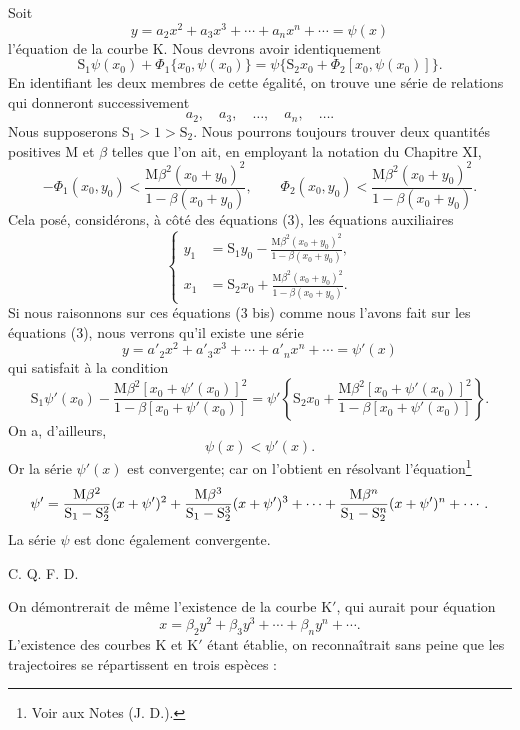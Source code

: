 \documentclass[11pt]{article}
\begin{document}
Soit
\[
y=a_2x^2+a_3x^3+\cdots+a_nx^n+\cdots=\psi(x)
\]
l’équation de la courbe K. Nous devrons avoir identiquement
\[
\mathrm{S}_1\psi(x_0)+\Phi_1\{x_0,\psi(x_0)\}
=\psi\{\mathrm{S}_2x_0+\Phi_2[x_0,\psi(x_0)]\}.
\]
En identifiant les deux membres de cette égalité, on trouve une série de relations qui donneront successivement
\[
a_2,
\quad a_3,
\quad \ldots,
\quad a_n,
\quad \ldots.
\]
Nous supposerons $\mathrm{S}_1>1>\mathrm{S}_2$. Nous pourrons toujours trouver deux quantités positives $\mathrm{M}$ et $\beta$ telles que l’on ait, en employant la notation du Chapitre XI,
\[
-\Phi_1(x_0,y_0)<\frac{\mathrm{M}\beta^2(x_0+y_0)^2}{1-\beta(x_0+y_0)},
\qquad
\Phi_2(x_0,y_0)<\frac{\mathrm{M}\beta^2(x_0+y_0)^2}{1-\beta(x_0+y_0)}.
\]
Cela posé, considérons, à côté des équations (3), les équations auxiliaires
\begin{equation}
\left\{
\begin{aligned}
y_1&=\mathrm{S}_1y_0-\frac{\mathrm{M}\beta^2(x_0+y_0)^2}{1-\beta(x_0+y_0)},\\
x_1&=\mathrm{S}_2x_0+\frac{\mathrm{M}\beta^2(x_0+y_0)^2}{1-\beta(x_0+y_0)}.
\end{aligned}
\right.
\tag{3 bis}
\end{equation}
Si nous raisonnons sur ces équations (3 bis) comme nous l’avons fait sur les équations (3), nous verrons qu’il existe une série
\[
y=a'_2x^2+a'_3x^3+\cdots+a'_nx^n+\cdots=\psi'(x)
\]
qui satisfait à la condition
\[
\mathrm{S}_1\psi'(x_0)-\frac{\mathrm{M}\beta^2[x_0+\psi'(x_0)]^2}{1-\beta[x_0+\psi'(x_0)]}
=\psi'\left\{\mathrm{S}_2x_0+\frac{\mathrm{M}\beta^2[x_0+\psi'(x_0)]^2}{1-\beta[x_0+\psi'(x_0)]}\right\}.
\]
On a, d’ailleurs,
\[
\psi(x)<\psi'(x).
\]
Or la série $\psi'(x)$ est convergente; car on l’obtient en résolvant l’équation\footnote{Voir aux Notes (J. D.).}
\[
\psi'=\frac{\mathrm{M}\beta^2}{\mathrm{S}_1-\mathrm{S}_2^2}(x+\psi')^2
+\frac{\mathrm{M}\beta^3}{\mathrm{S}_1-\mathrm{S}_2^3}(x+\psi')^3+\\[-0.2em]
\cdots+
\frac{\mathrm{M}\beta^n}{\mathrm{S}_1-\mathrm{S}_2^n}(x+\psi')^n+\cdots.
\]
La série $\psi$ est donc également convergente.
\begin{flushright}C. Q. F. D.\end{flushright}

On démontrerait de même l’existence de la courbe K$'$, qui aurait pour équation
\[
x=\beta_2y^2+\beta_3y^3+\cdots+\beta_ny^n+\cdots.
\]
L’existence des courbes K et K$'$ étant établie, on reconnaîtrait sans peine que les trajectoires se répartissent en trois espèces :
\end{document}
